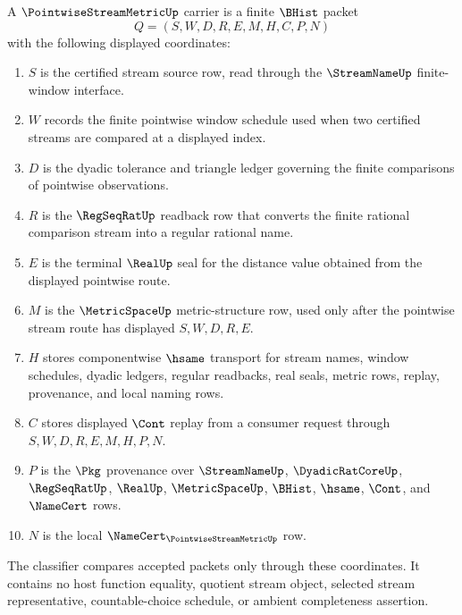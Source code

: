 \begin{definition}
\label{def:pointwise-stream-metric-carrier}
A $\PointwiseStreamMetricUp$ carrier is a finite $\BHist$ packet
$$
Q=(S,W,D,R,E,M,H,C,P,N)
$$
with the following displayed coordinates:
\begin{enumerate}
\item $S$ is the certified stream source row, read through the $\StreamNameUp$ finite-window interface.
\item $W$ records the finite pointwise window schedule used when two certified streams are compared at a displayed index.
\item $D$ is the dyadic tolerance and triangle ledger governing the finite comparisons of pointwise observations.
\item $R$ is the $\RegSeqRatUp$ readback row that converts the finite rational comparison stream into a regular rational name.
\item $E$ is the terminal $\RealUp$ seal for the distance value obtained from the displayed pointwise route.
\item $M$ is the $\MetricSpaceUp$ metric-structure row, used only after the pointwise stream route has displayed $S,W,D,R,E$.
\item $H$ stores componentwise $\hsame$ transport for stream names, window schedules, dyadic ledgers, regular readbacks, real seals, metric rows, replay, provenance, and local naming rows.
\item $C$ stores displayed $\Cont$ replay from a consumer request through $S,W,D,R,E,M,H,P,N$.
\item $P$ is the $\Pkg$ provenance over $\StreamNameUp$, $\DyadicRatCoreUp$, $\RegSeqRatUp$, $\RealUp$, $\MetricSpaceUp$, $\BHist$, $\hsame$, $\Cont$, and $\NameCert$ rows.
\item $N$ is the local $\NameCert_{\PointwiseStreamMetricUp}$ row.
\end{enumerate}
The classifier compares accepted packets only through these coordinates. It contains no host function equality, quotient stream object, selected stream representative, countable-choice schedule, or ambient completeness assertion.
\end{definition}

